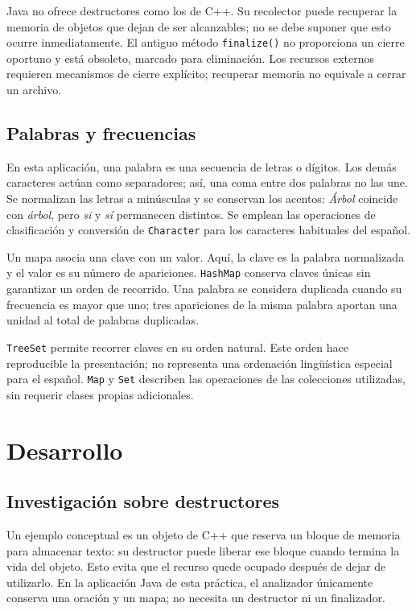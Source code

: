 \documentclass[letterpaper,12pt,oneside]{article}
\numberwithin{figure}{section}
\begin{document}
Java no ofrece destructores como los de C++. Su recolector puede recuperar la memoria de objetos que dejan de ser alcanzables; no se debe suponer que esto ocurre inmediatamente. El antiguo método \texttt{finalize()} no proporciona un cierre oportuno y está obsoleto, marcado para eliminación. Los recursos externos requieren mecanismos de cierre explícito; recuperar memoria no equivale a cerrar un archivo.\cite{finalizacion}

\subsection{Palabras y frecuencias}
En esta aplicación, una palabra es una secuencia de letras o dígitos. Los demás caracteres actúan como separadores; así, una coma entre dos palabras no las une. Se normalizan las letras a minúsculas y se conservan los acentos: \textit{Árbol} coincide con \textit{árbol}, pero \textit{si} y \textit{sí} permanecen distintos. Se emplean las operaciones de clasificación y conversión de \texttt{Character} para los caracteres habituales del español.\cite{caracter}

Un mapa asocia una clave con un valor. Aquí, la clave es la palabra normalizada y el valor es su número de apariciones. \texttt{HashMap} conserva claves únicas sin garantizar un orden de recorrido.\cite{mapa} Una palabra se considera duplicada cuando su frecuencia es mayor que uno; tres apariciones de la misma palabra aportan una unidad al total de palabras duplicadas.

\texttt{TreeSet} permite recorrer claves en su orden natural.\cite{conjunto} Este orden hace reproducible la presentación; no representa una ordenación lingüística especial para el español. \texttt{Map} y \texttt{Set} describen las operaciones de las colecciones utilizadas, sin requerir clases propias adicionales.

\section{Desarrollo}
\subsection{Investigación sobre destructores}
Un ejemplo conceptual es un objeto de C++ que reserva un bloque de memoria para almacenar texto: su destructor puede liberar ese bloque cuando termina la vida del objeto. Esto evita que el recurso quede ocupado después de dejar de utilizarlo.\cite{destructor} En la aplicación Java de esta práctica, el analizador únicamente conserva una oración y un mapa; no necesita un destructor ni un finalizador.\cite{finalizacion}
\end{document}
